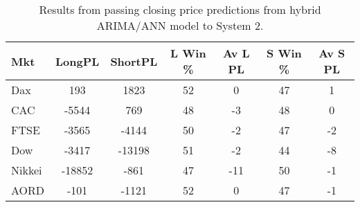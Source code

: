 \begin{table}[ht]
\centering
\caption[Results from passing closing price predictions from hybrid ARIMA/ANN model to System 2]{Results from passing closing price predictions from hybrid ARIMA/ANN model to System 2.} 
\label{tab:chp_ts:arima_ann_sys2}
\begin{tabular}{lcccccc}
  \toprule Mkt & LongPL & ShortPL & L Win \% & Av L PL & S Win \% & Av S PL \\ 
  \midrule Dax & 193 & 1823 & 52 & 0 & 47 & 1 \\ 
  CAC & -5544 & 769 & 48 & -3 & 48 & 0 \\ 
  FTSE & -3565 & -4144 & 50 & -2 & 47 & -2 \\ 
  Dow & -3417 & -13198 & 51 & -2 & 44 & -8 \\ 
  Nikkei & -18852 & -861 & 47 & -11 & 50 & -1 \\ 
  AORD & -101 & -1121 & 52 & 0 & 47 & -1 \\ 
   \bottomrule \end{tabular}
\end{table}
